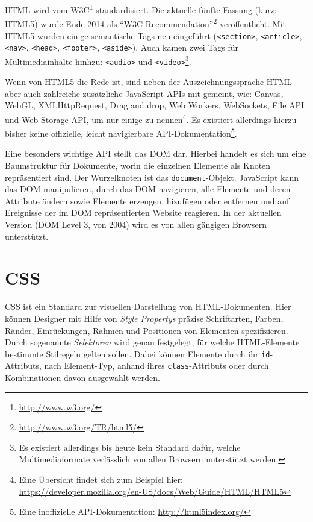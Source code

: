 \documentclass[a4paper, 12pt, hidelinks, listof=totoc, listoftables=totoc, bibliography=totoc]{scrreprt}
\newcommand{\html}[1]{\lstinline[language=HTML5, style=inline]|#1|}
\begin{document}
\ac{HTML} wird vom \ac{W3C}\footnote{\url{http://www.w3.org/}} standardisiert. Die aktuelle fünfte Fassung (kurz: HTML5) wurde Ende 2014 als "`W3C Recommendation"'\footnote{\url{http://www.w3.org/TR/html5/}} veröffentlicht. Mit HTML5 wurden einige semantische Tags neu eingeführt (\html{<section>}, \html{<article>}, \mbox{\html{<nav>}}, \html{<head>}, \html{<footer>}, \html{<aside>}). Auch kamen zwei Tags für Multimediainhalte hinhzu: \html{<audio>} und \html{<video>}\footnote{Es existiert allerdings bis heute kein Standard dafür, welche Multimediaformate verlässlich von allen Browsern unterstützt werden.}.

Wenn von HTML5 die Rede ist, sind neben der Auszeichnungssprache \ac{HTML} aber auch zahlreiche zusätzliche JavaScript-APIs mit gemeint, wie: Canvas, WebGL, XMLHttpRequest, Drag and drop, Web Workers, WebSockets, File API und Web Storage API, um nur einige zu nennen\footnote{Eine Übersicht findet sich zum Beispiel hier: \url{https://developer.mozilla.org/en-US/docs/Web/Guide/HTML/HTML5}}. Es existiert allerdings hierzu bisher keine offizielle, leicht navigierbare \ac{API}-Dokumentation\footnote{Eine inoffizielle \ac{API}-Dokumentation: \url{http://html5index.org/}}.

Eine besonders wichtige \ac{API} stellt das \ac{DOM} dar. Hierbei handelt es sich um eine Baumstruktur für Dokumente, worin die einzelnen Elemente als Knoten repräsentiert sind. Der Wurzelknoten ist das \html{document}-Objekt. JavaScript kann das \ac{DOM} manipulieren, durch das \ac{DOM} navigieren, alle Elemente und deren Attribute ändern sowie Elemente erzeugen, hizufügen oder entfernen und auf Ereignisse der im \ac{DOM} repräsentierten Website reagieren. In der aktuellen Version (\ac{DOM} Level 3, von 2004) wird es von allen gängigen Browsern unterstützt.



\section{CSS}\label{sec:css}

\ac{CSS} ist ein Standard zur visuellen Darstellung von \ac{HTML}-Dokumenten. Hier können Designer mit Hilfe von \emph{Style Propertys} präzise Schriftarten, Farben, Ränder, Einrückungen, Rahmen und Positionen von Elementen spezifizieren. Durch sogenannte \emph{Selektoren} wird genau festgelegt, für welche \ac{HTML}-Elemente bestimmte Stilregeln gelten sollen. Dabei können Elemente durch ihr \html{id}-Attributs, nach Element-Typ, anhand ihres \html{class}-Attributs oder durch Kombinationen davon ausgewählt werden.
\end{document}
